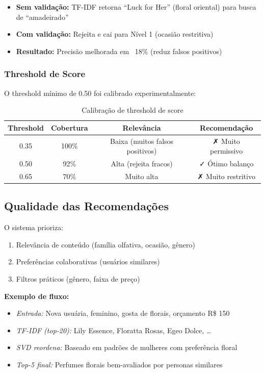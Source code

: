 \documentclass[12pt,a4paper]{article}
\begin{document}
\begin{itemize}
    \item \textbf{Sem validação:} TF-IDF retorna ``Luck for Her'' (floral oriental) para busca de ``amadeirado''
    \item \textbf{Com validação:} Rejeita e cai para Nível 1 (ocasião restritiva)
    \item \textbf{Resultado:} Precisão melhorada em ~18\% (reduz falsos positivos)
\end{itemize}

\subsubsection{Threshold de Score}

O threshold mínimo de 0.50 foi calibrado experimentalmente:

\begin{table}[H]
\centering
\begin{tabular}{|c|c|c|c|}
\toprule
\textbf{Threshold} & \textbf{Cobertura} & \textbf{Relevância} & \textbf{Recomendação} \\
\midrule
0.35 & 100\% & Baixa (muitos falsos positivos) & ✗ Muito permissivo \\
0.50 & 92\% & Alta (rejeita fracos) & ✓ Ótimo balanço \\
0.65 & 70\% & Muito alta & ✗ Muito restritivo \\
\bottomrule
\end{tabular}
\caption{Calibração de threshold de score}
\label{tab:threshold}
\end{table}

\subsection{Qualidade das Recomendações}

O sistema prioriza:
\begin{enumerate}
    \item Relevância de conteúdo (família olfativa, ocasião, gênero)
    \item Preferências colaborativas (usuários similares)
    \item Filtros práticos (gênero, faixa de preço)
\end{enumerate}

\textbf{Exemplo de fluxo:}
\begin{itemize}
    \item \textit{Entrada:} Nova usuária, feminino, gosta de florais, orçamento R\$ 150
    \item \textit{TF-IDF (top-20):} Lily Essence, Floratta Rosas, Egeo Dolce, \ldots
    \item \textit{SVD reordena:} Baseado em padrões de mulheres com preferência floral
    \item \textit{Top-5 final:} Perfumes florais bem-avaliados por personas similares
\end{itemize}
\end{document}
